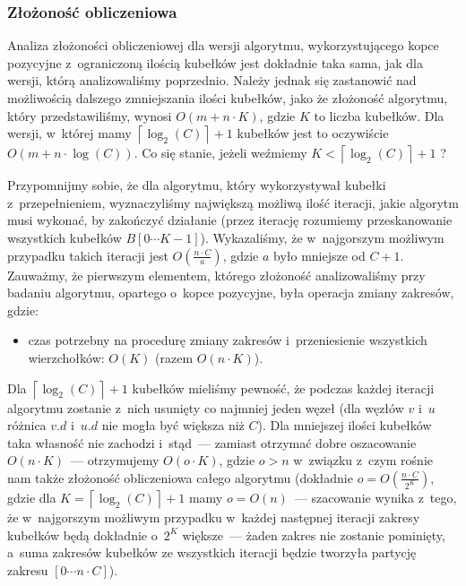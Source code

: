 \subsubsection{Złożoność obliczeniowa}

Analiza złożoności obliczeniowej dla wersji algorytmu, wykorzystującego kopce pozycyjne z~ograniczoną ilością kubełków jest dokładnie taka sama, jak dla wersji, którą analizowaliśmy poprzednio. Należy jednak się zastanowić nad możliwością dalszego zmniejszania ilości kubełków, jako że złożoność algorytmu, który przedstawiliśmy, wynosi $ O \left( m + n \cdot K \right)$, gdzie $K$ to liczba kubełków. Dla wersji, w~której mamy $ \left \lceil \log_{2} \left( C \right) \right \rceil + 1$ kubełków jest to oczywiście $ O \left( m + n \cdot \log \left( C \right) \right)$. Co się stanie, jeżeli weźmiemy $K < \left \lceil \log_{2} \left( C \right) \right \rceil + 1$ ?

Przypomnijmy sobie, że dla algorytmu, który wykorzystywał kubełki z~przepełnieniem, wyznaczyliśmy największą możliwą ilość iteracji, jakie algorytm musi wykonać, by zakończyć działanie (przez iterację rozumiemy przeskanowanie wszystkich kubełków $B \left[ 0 \cdots K - 1\right]$). Wykazaliśmy, że w~najgorszym możliwym przypadku takich iteracji jest $ O \left( \frac{n \cdot C}{a} \right)$, gdzie $a$ było mniejsze od $C + 1$. Zauważmy, że pierwszym elementem, którego złożoność analizowaliśmy przy badaniu algorytmu, opartego o~kopce pozycyjne, była operacja zmiany zakresów, gdzie:

\begin{itemize}
\item czas potrzebny na procedurę zmiany zakresów i~przeniesienie wszystkich wierzchołków: $ O \left( K \right)$ (razem $ O \left( n \cdot K \right)$).
\end{itemize}

Dla $ \left \lceil \log_{2} \left( C \right) \right \rceil + 1$ kubełków mieliśmy pewność, że podczas każdej iteracji algorytmu zostanie z~nich usunięty co najmniej jeden węzeł (dla węzłów $v$ i~$u$ różnica $v.d$ i~$u.d$ nie mogła być większa niż $C$). Dla mniejszej ilości kubełków taka własność nie zachodzi i~stąd~--- zamiast otrzymać dobre oszacowanie $ O \left( n \cdot K \right)$~--- otrzymujemy $ O \left( o \cdot K \right)$, gdzie $o > n $ w~związku z~czym rośnie nam także złożoność obliczeniowa całego algorytmu (dokładnie $o = O \left( \frac{n \cdot C}{2^{K}}\right)$, gdzie dla $K = \left \lceil \log_{2} \left( C \right) \right \rceil + 1$ mamy $o = O \left( n \right)$~--- szacowanie wynika z~tego, że w~najgorszym możliwym przypadku w~każdej następnej iteracji zakresy kubełków będą dokładnie o~$2^{K}$ większe~--- żaden zakres nie zostanie pominięty, a~suma zakresów kubełków ze wszystkich iteracji będzie tworzyła partycję zakresu $\left[ 0 \cdots n \cdot C \right]$).